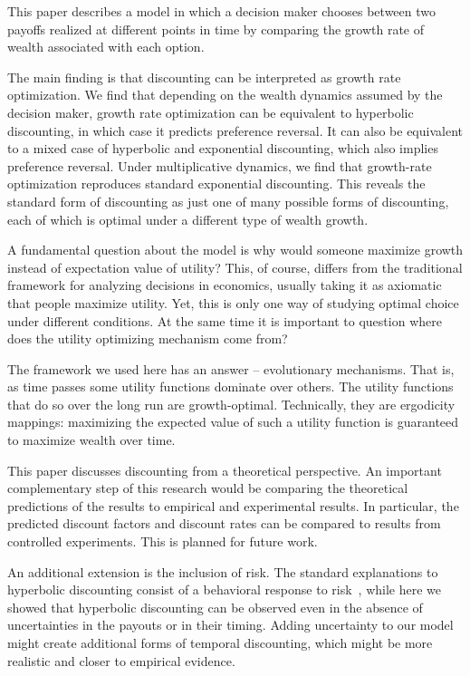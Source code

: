 \documentclass[11pt]{article}
\numberwithin{equation}{section}
\begin{document}
This paper describes a model in which a decision maker chooses between two payoffs realized at different points in time by comparing the growth rate of wealth associated with each option.

The main finding is that discounting can be interpreted as growth rate optimization. We find that depending on the wealth dynamics assumed by the decision maker, growth rate optimization can be equivalent to hyperbolic discounting, in which case it predicts preference reversal. It can also be equivalent to a mixed case of hyperbolic and exponential discounting, which also implies preference reversal. Under multiplicative dynamics, we find that growth-rate optimization reproduces standard exponential discounting. This reveals the standard form of discounting as just one of many possible forms of discounting, each of which is optimal under a different type of wealth growth.

A fundamental question about the model is why would someone maximize growth instead of expectation value of utility? This, of course, differs from the traditional framework for analyzing decisions in economics, usually taking it as axiomatic that people maximize utility. Yet, this is only one way of studying optimal choice under different conditions. At the same time it is important to question where does the utility optimizing mechanism come from?

The framework we used here has an answer -- evolutionary mechanisms. That is, as time passes some utility functions dominate over others. The utility functions that do so over the long run are growth-optimal. Technically, they are ergodicity mappings: maximizing the expected value of such a utility function is guaranteed to maximize wealth over time.

This paper discusses discounting from a theoretical perspective. An important complementary step of this research would be comparing the theoretical predictions of the results to empirical and experimental results. In particular, the predicted discount factors and discount rates can be compared to results from controlled experiments. This is planned for future work.

An additional extension is the inclusion of risk. The standard explanations to hyperbolic discounting consist of a behavioral response to risk~\citep{sozou1998hyperbolic,dasgupta2005uncertainty}, while here we showed that hyperbolic discounting can be observed even in the absence of uncertainties in the payouts or in their timing. Adding uncertainty to our model might create additional forms of temporal discounting, which might be more realistic and closer to empirical evidence.
\end{document}
